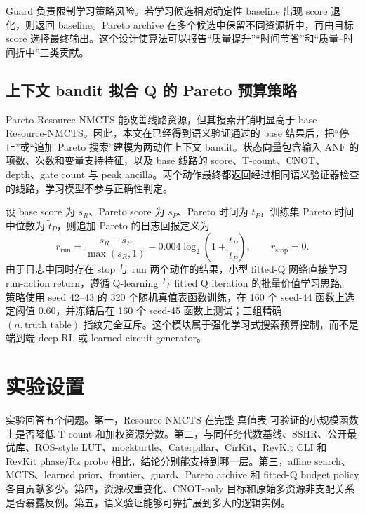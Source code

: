 \documentclass[UTF8,fontset=macnew,11pt]{ctexart}
\newcommand{\method}{Resource-NMCTS}
\newcommand{\anf}{\ensuremath{\mathrm{ANF}}}
\newcommand{\mcts}{\ensuremath{\mathrm{MCTS}}}
\newcommand{\ttable}{真值表}
\begin{document}
Guard 负责限制学习策略风险。若学习候选相对确定性 baseline 出现 score 退化，则返回 baseline。Pareto archive 在多个候选中保留不同资源折中，再由目标 score 选择最终输出。这个设计使算法可以报告“质量提升”“时间节省”和“质量--时间折中”三类贡献。

\subsection{上下文 bandit 拟合 Q 的 Pareto 预算策略}

Pareto-\method{} 能改善线路资源，但其搜索开销明显高于 base \method{}。因此，本文在已经得到语义验证通过的 base 结果后，把“停止”或“追加 Pareto 搜索”建模为两动作上下文 bandit\cite{li2010contextual}。状态向量包含输入 \anf{} 的项数、次数和变量支持特征，以及 base 线路的 score、T-count、CNOT、depth、gate count 与 peak ancilla。两个动作最终都返回经过相同语义验证器检查的线路，学习模型不参与正确性判定。

设 base score 为 $s_R$、Pareto score 为 $s_P$、Pareto 时间为 $t_P$，训练集 Pareto 时间中位数为 $\widetilde t_P$，则追加 Pareto 的日志回报定义为
\begin{equation}
r_{\mathrm{run}}=
\frac{s_R-s_P}{\max(s_R,1)}
-0.004\log_2\!\left(1+\frac{t_P}{\widetilde t_P}\right),
\qquad
r_{\mathrm{stop}}=0 .
\label{eq:budget-policy-reward}
\end{equation}
由于日志中同时存在 stop 与 run 两个动作的结果，小型 fitted-Q 网络直接学习 run-action return，遵循 Q-learning 与 fitted Q iteration 的批量价值学习思路\cite{watkins1992qlearning,ernst2005fittedq}。策略使用 seed 42--43 的 320 个随机真值表函数训练，在 160 个 seed-44 函数上选定阈值 0.60，并冻结后在 160 个 seed-45 函数上测试；三组精确 $(n,\text{truth table})$ 指纹完全互斥。这个模块属于强化学习式搜索预算控制，而不是端到端 deep RL 或 learned circuit generator。

\section{实验设置}

实验回答五个问题。第一，\method{} 在完整 \ttable{} 可验证的小规模函数上是否降低 T-count 和加权资源分数。第二，与同任务代数基线、SSHR、公开最优库、ROS-style LUT、mockturtle、Caterpillar、CirKit、RevKit CLI 和 RevKit phase/Rz probe 相比，结论分别能支持到哪一层。第三，affine search、\mcts{}、learned prior、frontier、guard、Pareto archive 和 fitted-Q budget policy 各自贡献多少。第四，资源权重变化、CNOT-only 目标和原始多资源非支配关系是否暴露反例。第五，语义验证能够可靠扩展到多大的逻辑实例。
\end{document}
